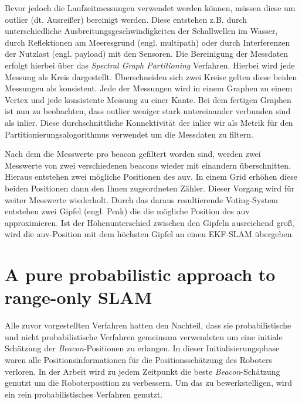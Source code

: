 Bevor jedoch die Laufzeitmessungen verwendet werden können, müssen diese um \Gls{outlier} (dt. Ausreißer) bereinigt werden. Diese entstehen z.B. durch unterschiedliche Ausbreitungsgeschwindigkeiten der Schallwellen im Wasser, durch Reflektionen am Meeresgrund (engl. \Gls{multipath}) oder durch Interferenzen der Nutzlast (engl. \Gls{payload}) mit den Sensoren. Die Bereinigung der Messdaten erfolgt hierbei über das \textit{Spectral Graph Partitioning} Verfahren. Hierbei wird jede Messung als Kreis dargestellt. Überschneiden sich zwei Kreise gelten diese beiden Messungen als konsistent. Jede der Messungen wird in einem Graphen zu einem Vertex und jede konsistente Messung zu einer Kante. Bei dem fertigen Graphen ist nun zu beobachten, dass \Gls{outlier} weniger stark untereinander verbunden sind als \Gls{inlier}. Diese durchschnittliche Konnektivität der \Gls{inlier} wir als Metrik für den Partitionierungsalogorithmus verwendet um die Messdaten zu filtern.

Nach dem die Messwerte pro \Gls{beacon} gefiltert worden sind, werden zwei Messwerte von zwei verschiedenen \Glspl{beacon} wieder mit einandern überschnitten. Hieraus entstehen zwei mögliche Positionen des \gls{auv}. In einem Grid erhöhen diese beiden Positionen dann den Ihnen zugeordneten Zähler. Dieser Vorgang wird für weiter Messwerte wiederholt. Durch das daraus resultierende Voting-System entstehen zwei Gipfel (engl. Peak) die die mögliche Position des \gls{auv} approximieren. Ist der Höhenunterschied zwischen den Gipfeln ausreichend groß, wird die \gls{auv}-Position mit dem höchsten Gipfel an einen EKF-SLAM übergeben.


%
%


%
%
%
\section{A pure probabilistic approach to range-only SLAM}\label{sec:blanco2008pure}

Alle zuvor vorgestellten Verfahren hatten den Nachteil, dass sie probabilistische und nicht probabilistische Verfahren gemeinsam verwendeten um eine initiale Schätzung der \textit{Beacon}-Positionen zu erlangen. In dieser Initialisierungsphase waren alle Positionsinformationen für die Positionsschätzung des Roboters verloren. In der Arbeit  \cite{blanco2008pure} wird zu jedem Zeitpunkt die beste \textit{Beacon}-Schätzung genutzt um die Roboterposition zu verbessern. Um das zu bewerkstelligen, wird ein rein probabilistisches Verfahren genutzt.

